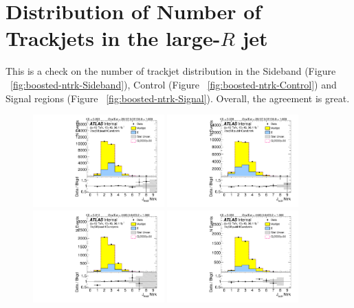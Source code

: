 \section{Distribution of Number of Trackjets in the large-$R$ jet}
\label{app:ntrkjet}

This is a check on the number of trackjet distribution in the Sideband (Figure ~\ref{fig:boosted-ntrk-Sideband}), Control (Figure ~\ref{fig:boosted-ntrk-Control}) and Signal regions (Figure ~\ref{fig:boosted-ntrk-Signal}). Overall, the agreement is great.


\begin{figure}[htbp!]
\begin{center}
\includegraphics[width=0.45\textwidth,angle=-90]{figures/boosted/Sideband/b77_TwoTag_split_Sideband_leadHCand_ntrk.pdf}
\includegraphics[width=0.45\textwidth,angle=-90]{figures/boosted/Sideband/b77_TwoTag_split_Sideband_sublHCand_ntrk.pdf}\\
\includegraphics[width=0.45\textwidth,angle=-90]{figures/boosted/Sideband/b77_ThreeTag_Sideband_leadHCand_ntrk.pdf}
\includegraphics[width=0.45\textwidth,angle=-90]{figures/boosted/Sideband/b77_ThreeTag_Sideband_sublHCand_ntrk.pdf}\\

\end{center}
\end{figure}
